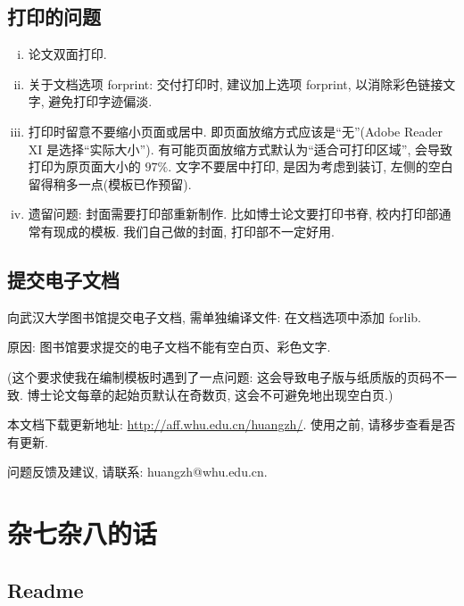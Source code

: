 \documentclass{WHUPhd}  %
\begin{document}
\section{打印的问题}
\begin{enumerate}[i)]
  \item  论文双面打印.
  \item  关于文档选项 forprint: 交付打印时, 建议加上选项 forprint, 以消除彩色链接文字, 避免打印字迹偏淡.
  \item  打印时留意不要缩小页面或居中. 即页面放缩方式应该是``无''(Adobe Reader XI 是选择``实际大小'').
           有可能页面放缩方式默认为``适合可打印区域'', 会导致打印为原页面大小的 $97\%$.
           文字不要居中打印, 是因为考虑到装订, 左侧的空白留得稍多一点(模板已作预留).
  \item  遗留问题: 封面需要打印部重新制作. 比如博士论文要打印书脊, 校内打印部通常有现成的模板.
           我们自己做的封面, 打印部不一定好用.
\end{enumerate}




\section{提交电子文档}

向武汉大学图书馆提交电子文档, 需单独编译文件: 在文档选项中添加 forlib.

原因: 图书馆要求提交的电子文档不能有空白页、彩色文字.

({\kaishu 这个要求使我在编制模板时遇到了一点问题: 这会导致电子版与纸质版的页码不一致. 博士论文每章的起始页默认在奇数页, 这会不可避免地出现空白页.})


\vfill

本文档下载更新地址: \url{http://aff.whu.edu.cn/huangzh/}. 使用之前, 请移步查看是否有更新.

问题反馈及建议, 请联系: huangzh@whu.edu.cn.

\chapter{杂七杂八的话}

\section{Readme}
\end{document}
